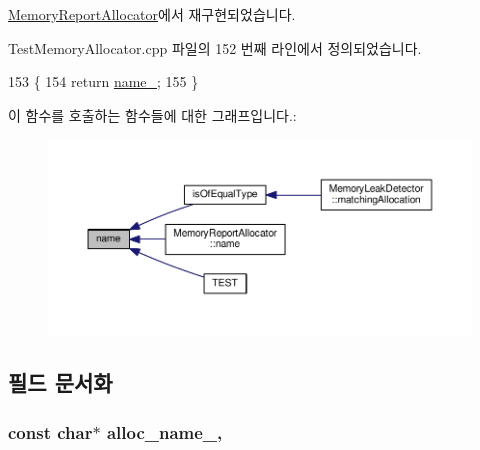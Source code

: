 \hyperlink{class_memory_report_allocator_a90b3e100eca6e28565e6447326b1f7b0}{Memory\+Report\+Allocator}에서 재구현되었습니다.



Test\+Memory\+Allocator.\+cpp 파일의 152 번째 라인에서 정의되었습니다.


\begin{DoxyCode}
153 \{
154     \textcolor{keywordflow}{return} \hyperlink{class_test_memory_allocator_a7dac8366c11fbcad2f49d85fe8fc4fbe}{name\_};
155 \}
\end{DoxyCode}


이 함수를 호출하는 함수들에 대한 그래프입니다.\+:
\nopagebreak
\begin{figure}[H]
\begin{center}
\leavevmode
\includegraphics[width=350pt]{class_test_memory_allocator_a6a96605bec5749750a0b4be6e2d6e721_icgraph}
\end{center}
\end{figure}




\subsection{필드 문서화}
\subsubsection[{\texorpdfstring{alloc\+\_\+name\+\_\+}{alloc_name_}}]{\setlength{\rightskip}{0pt plus 5cm}const char$\ast$ alloc\+\_\+name\+\_\+\hspace{0.3cm}{\ttfamily [protected]}, {\ttfamily [inherited]}}\hypertarget{class_test_memory_allocator_ae5a98ff3b709da10db95a0ed03362548}{}\label{class_test_memory_allocator_ae5a98ff3b709da10db95a0ed03362548}


